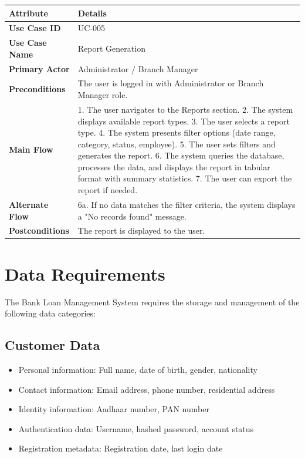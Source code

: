 \documentclass[12pt,a4paper,oneside]{report}
\begin{document}
\begin{table}[htbp]
\centering
\small
\begin{tabularx}{\textwidth}{l l}
\toprule
\textbf{Attribute} & \textbf{Details} \\
\midrule
\textbf{Use Case ID} & UC-005 \\
\textbf{Use Case Name} & Report Generation \\
\textbf{Primary Actor} & Administrator / Branch Manager \\
\textbf{Preconditions} & The user is logged in with Administrator or Branch Manager role. \\
\textbf{Main Flow} & 1. The user navigates to the Reports section. 2. The system displays available report types. 3. The user selects a report type. 4. The system presents filter options (date range, category, status, employee). 5. The user sets filters and generates the report. 6. The system queries the database, processes the data, and displays the report in tabular format with summary statistics. 7. The user can export the report if needed. \\
\textbf{Alternate Flow} & 6a. If no data matches the filter criteria, the system displays a "No records found" message. \\
\textbf{Postconditions} & The report is displayed to the user. \\
\bottomrule
\end{tabularx}
\end{table}

\section{Data Requirements}

The Bank Loan Management System requires the storage and management of the following data categories:

\subsection{Customer Data}

\begin{itemize}
  \item Personal information: Full name, date of birth, gender, nationality
  \item Contact information: Email address, phone number, residential address
  \item Identity information: Aadhaar number, PAN number
  \item Authentication data: Username, hashed password, account status
  \item Registration metadata: Registration date, last login date
\end{itemize}
\end{document}
